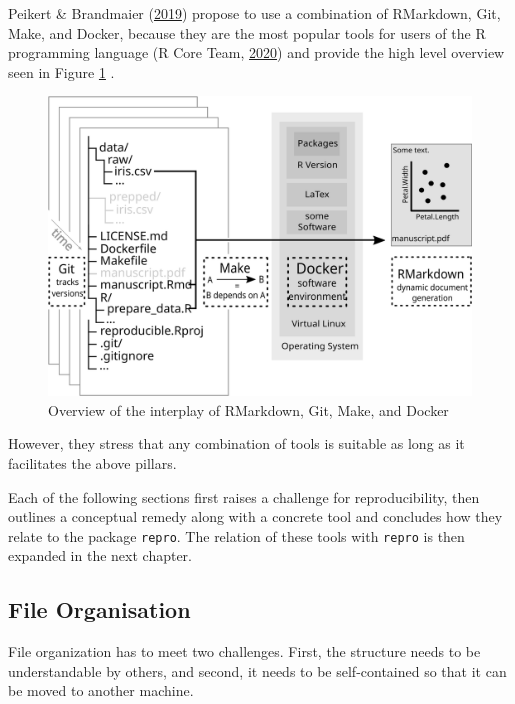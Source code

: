\documentclass[12pt,a4paper,]{article}
\begin{document}
Peikert \& Brandmaier (\protect\hyperlink{ref-peikertReproducibleDataAnalysis2019}{2019}) propose to use a combination of RMarkdown, Git, Make, and Docker, because they are the most popular tools for users of the R programming language (R Core Team, \protect\hyperlink{ref-R-base}{2020}) and provide the high level overview seen in Figure \ref{fig:nutshell} .

\begin{figure}

{\centering \includegraphics[width=1\linewidth]{images/nutshell} 

}

\caption{Overview of the interplay of RMarkdown, Git, Make, and Docker}\label{fig:nutshell}
\end{figure}

However, they stress that any combination of tools is suitable as long as it facilitates the above pillars.

Each of the following sections first raises a challenge for reproducibility, then outlines a conceptual remedy along with a concrete tool and concludes how they relate to the package \texttt{repro}. The relation of these tools with \texttt{repro} is then expanded in the next chapter.

\hypertarget{file-organisation}{%
\subsection{File Organisation}\label{file-organisation}}

File organization has to meet two challenges. First, the structure needs to be understandable by others, and second, it needs to be self-contained so that it can be moved to another machine.
\end{document}

